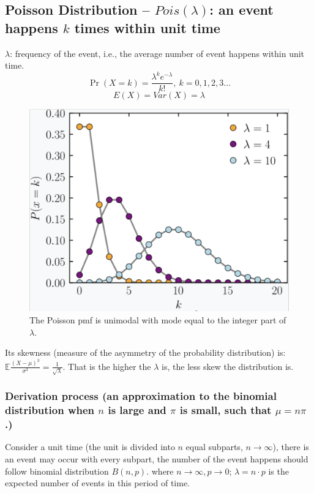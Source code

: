 \documentclass[11pt]{elegantbook}
\begin{document}
\subsection{Poisson Distribution -- $Pois(\lambda)$: an event happens $k$ times within unit time}
$\lambda$: frequency of the event, i.e., the average number of event happens within unit time.
$$\Pr(X{=}k)= \frac{\lambda^k e^{-\lambda}}{k!},\ k=0,1,2,3...$$
$$E(X)=Var(X)=\lambda$$
\begin{center}\begin{figure}[htbp]
    \centering
    \includegraphics[scale=0.2]{Poisson Distribution graph.png}
    \caption{The Poisson pmf is unimodal with mode equal to the integer part of $\lambda$.}
\end{figure}\end{center}
\vspace{-1cm}
Its skewness (measure of the asymmetry of the probability distribution) is: $\mathbb{E}\frac{(X-\mu)^3}{\sigma^3}=\frac{1}{\sqrt{\lambda}}$. That is the higher the $\lambda$ is, the less skew the distribution is.

\subsubsection*{Derivation process (an approximation to the binomial distribution when $n$ is large and $\pi$ is small, such that $\mu=n\pi$.)}
Consider a unit time (the unit is divided into $n$ equal subparts, $n \rightarrow \infty$), there is an event may occur with every subpart, the number of the event happens should follow binomial distribution $B(n,p)$. where $n \rightarrow \infty, p \rightarrow 0$; $\lambda=n\cdot p$ is the expected number of events in this period of time.
\end{document}
